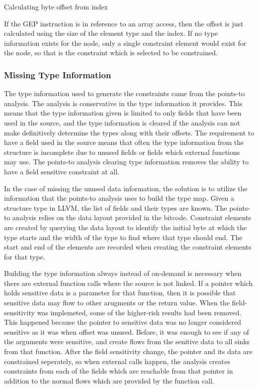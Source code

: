 \documentclass[11pt,a4paper]{article}
\begin{document}
\begin{algorithm}
  \caption{Calculating byte offset from index}
  \label{alg:find_offset}
  
\end{algorithm}

If the GEP instruction is in reference to an array access, then the offset is
just calculated using the size of the element type and the index. If no type
information exists for the node, only a single constraint element would exist
for the node, so that is the constraint which is selected to be constrained. 

\subsubsection{Missing Type Information}

The type information used to generate the constraints came from the points-to
analysis. The analysis is conservative in the type information it
provides. This means that the type information given is limited to only fields
that have been used in the source, and the type information is cleared if the
analysis can not make definitively determine the types along with their offsets.
The requirement to have a field used in the source means that often the type
information from the structure is incomplete due to unused fields or fields
which external functions may use. The points-to analysis clearing type
information removes the ability to have a field sensitive constraint at all.

In the case of missing the unused data information, the solution is to utilize
the information that the points-to analysis uses to build the type map. Given a
structure type in LLVM, the list of fields and their types are known. The
points-to analysis relies on the data layout provided in the bitcode. Constraint
elements are created by querying the data layout to identify the initial byte at
which the type starts and the width of the type to find where that type should
end. The start and end of the elements are recorded when creating the constraint
elements for that type.

Building the type information always instead of on-demand is necessary when
there are external function calls where the source is not linked. If a pointer
which holds sensitive data is a parameter for that function, then it is possible
that sensitive data may flow to other arugments or the return value. When the
field-sensitivity was implemeted, some of the higher-risk results had been
removed. This happened because the pointer to sensitive data was no longer
considered sensitive as it was when offset was unused. Before, it was enough to
see if any of the arguments were sensitive, and create flows from the senitive
data to all sinks from that function. After the field sensitivity change, the
pointer and its data are constrained seperately, so when external calls happen,
the analysis creates constraints from each of the fields which are reachable
from that pointer in addition to the normal flows which are provided by the
function call.
\end{document}
